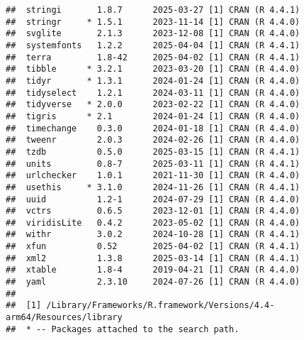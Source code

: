 \documentclass[
]{article}
\newenvironment{Shaded}{\begin{snugshade}}{\end{snugshade}}
\newcommand{\CommentTok}[1]{\textcolor[rgb]{0.56,0.35,0.01}{\textit{#1}}}
\newcommand{\DecValTok}[1]{\textcolor[rgb]{0.00,0.00,0.81}{#1}}
\newcommand{\FunctionTok}[1]{\textcolor[rgb]{0.13,0.29,0.53}{\textbf{#1}}}
\newcommand{\NormalTok}[1]{#1}
\newcommand{\SpecialCharTok}[1]{\textcolor[rgb]{0.81,0.36,0.00}{\textbf{#1}}}
\newcommand{\StringTok}[1]{\textcolor[rgb]{0.31,0.60,0.02}{#1}}
\begin{document}
\begin{verbatim}
##  stringi       1.8.7      2025-03-27 [1] CRAN (R 4.4.1)
##  stringr     * 1.5.1      2023-11-14 [1] CRAN (R 4.4.0)
##  svglite       2.1.3      2023-12-08 [1] CRAN (R 4.4.0)
##  systemfonts   1.2.2      2025-04-04 [1] CRAN (R 4.4.1)
##  terra         1.8-42     2025-04-02 [1] CRAN (R 4.4.1)
##  tibble      * 3.2.1      2023-03-20 [1] CRAN (R 4.4.0)
##  tidyr       * 1.3.1      2024-01-24 [1] CRAN (R 4.4.0)
##  tidyselect    1.2.1      2024-03-11 [1] CRAN (R 4.4.0)
##  tidyverse   * 2.0.0      2023-02-22 [1] CRAN (R 4.4.0)
##  tigris      * 2.1        2024-01-24 [1] CRAN (R 4.4.0)
##  timechange    0.3.0      2024-01-18 [1] CRAN (R 4.4.0)
##  tweenr        2.0.3      2024-02-26 [1] CRAN (R 4.4.0)
##  tzdb          0.5.0      2025-03-15 [1] CRAN (R 4.4.1)
##  units         0.8-7      2025-03-11 [1] CRAN (R 4.4.1)
##  urlchecker    1.0.1      2021-11-30 [1] CRAN (R 4.4.0)
##  usethis     * 3.1.0      2024-11-26 [1] CRAN (R 4.4.1)
##  uuid          1.2-1      2024-07-29 [1] CRAN (R 4.4.0)
##  vctrs         0.6.5      2023-12-01 [1] CRAN (R 4.4.0)
##  viridisLite   0.4.2      2023-05-02 [1] CRAN (R 4.4.0)
##  withr         3.0.2      2024-10-28 [1] CRAN (R 4.4.1)
##  xfun          0.52       2025-04-02 [1] CRAN (R 4.4.1)
##  xml2          1.3.8      2025-03-14 [1] CRAN (R 4.4.1)
##  xtable        1.8-4      2019-04-21 [1] CRAN (R 4.4.0)
##  yaml          2.3.10     2024-07-26 [1] CRAN (R 4.4.0)
## 
##  [1] /Library/Frameworks/R.framework/Versions/4.4-arm64/Resources/library
##  * -- Packages attached to the search path.
\end{verbatim}

\begin{Shaded}
\end{Shaded}
\end{document}
